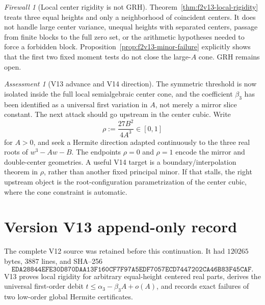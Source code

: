 \documentclass[11pt]{article}
\theoremstyle{definition}
\theoremstyle{remark}
\newtheorem{assessment}[theorem]{Assessment}
\newtheorem{firewall}[theorem]{Firewall}
\begin{document}
\begin{firewall}[Local center rigidity is not GRH]
Theorem~\ref{thm:f2v13-local-rigidity} treats three equal heights and only
a neighborhood of coincident centers.  It does not handle large center
variance, unequal heights with separated centers, passage from finite
blocks to the full zero set, or the arithmetic hypotheses needed to force
a forbidden block.  Proposition~\ref{prop:f2v13-minor-failure} explicitly
shows that the first two fixed moment tests do not close the large-\(A\)
cone.  GRH remains open.
\end{firewall}

\begin{assessment}[V13 advance and V14 direction]
The symmetric threshold is now isolated inside the full local
semialgebraic center cone, and the coefficient \(\beta _3\) has been
identified as a universal first variation in \(A\), not merely a mirror
slice constant.  The next attack should go upstream in the center cubic.
Write
\[
 \rho:=\frac{27B^2}{4A^3}\in[0,1]
 \tag{N13.24}
\]
for \(A>0\), and seek a Hermite direction adapted continuously to the
three real roots of \(w^3-Aw-B\).  The endpoints \(\rho=0\) and \(\rho=1\)
encode the mirror and double-center geometries.  A useful V14 target is a
boundary/interpolation theorem in \(\rho\), rather than another fixed
principal minor.  If that stalls, the right upstream object is the
root-configuration parametrization of the center cubic, where the cone
constraint is automatic.
\end{assessment}

\section*{Version V13 append-only record}
The complete V12 source was retained before this continuation.  It had
\(120265\) bytes, \(3887\) lines, and SHA--256
\[
 \texttt{EDA28844EFE30D870DAA13F160CF7F97A5EDF7057ECD7447202CA46B83F45CAF}.
\]
V13 proves local rigidity for arbitrary equal-height centered real parts,
derives the universal first-order debit
\(t\leq\alpha _3-\beta _3A+o(A)\), and records exact failures of two
low-order global Hermite certificates.



\end{document}
